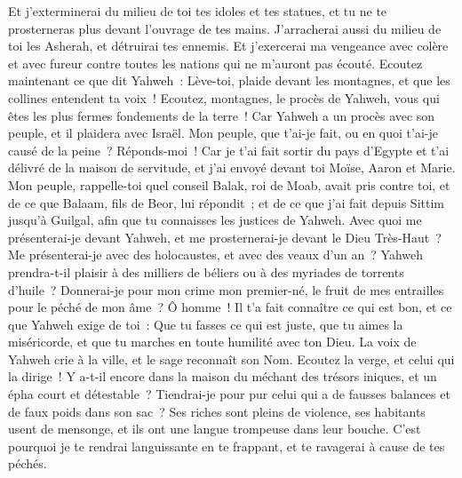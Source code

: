 \begin{multicols}{2}
Et j'exterminerai du milieu de toi tes idoles et tes statues, et tu ne te prosterneras plus devant l'ouvrage de tes mains.
J'arracherai aussi du milieu de toi les Asherah, et détruirai tes ennemis.
Et j'exercerai ma vengeance avec colère et avec fureur contre toutes les nations qui ne m'auront pas écouté.
\VerseOne{}Ecoutez maintenant ce que dit Yahweh~: Lève-toi, plaide devant les montagnes, et que les collines entendent ta voix~!
Ecoutez, montagnes, le procès de Yahweh, vous qui êtes les plus fermes fondements de la terre~! Car Yahweh a un procès avec son peuple, et il plaidera avec Israël.
Mon peuple, que t'ai-je fait, ou en quoi t'ai-je causé de la peine~? Réponds-moi~!
Car je t'ai fait sortir du pays d'Egypte et t'ai délivré de la maison de servitude, et j'ai envoyé devant toi Moïse, Aaron et Marie.
Mon peuple, rappelle-toi quel conseil Balak, roi de Moab, avait pris contre toi, et de ce que Balaam, fils de Beor, lui répondit~; et de ce que j'ai fait depuis Sittim jusqu'à Guilgal, afin que tu connaisses les justices de Yahweh.
Avec quoi me présenterai-je devant Yahweh, et me prosternerai-je devant le Dieu Très-Haut~? Me présenterai-je avec des holocaustes, et avec des veaux d'un an~?
Yahweh prendra-t-il plaisir à des milliers de béliers ou à des myriades de torrents d'huile~? Donnerai-je pour mon crime mon premier-né, le fruit de mes entrailles pour le péché de mon âme~?
Ô homme~! Il t'a fait connaître ce qui est bon, et ce que Yahweh exige de toi~: Que tu fasses ce qui est juste, que tu aimes la miséricorde, et que tu marches en toute humilité avec ton Dieu.
La voix de Yahweh crie à la ville, et le sage reconnaît son Nom. Ecoutez la verge, et celui qui la dirige~!
Y a-t-il encore dans la maison du méchant des trésors iniques, et un épha court et détestable~?
Tiendrai-je pour pur celui qui a de fausses balances et de faux poids dans son sac~?
Ses riches sont pleins de violence, ses habitants usent de mensonge, et ils ont une langue trompeuse dans leur bouche.
C'est pourquoi je te rendrai languissante en te frappant, et te ravagerai à cause de tes péchés.

\end{multicols}
